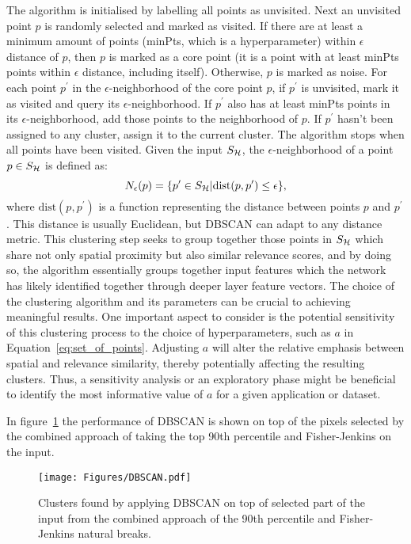 The algorithm is initialised by labelling all points as unvisited. Next an unvisited point $p$ is randomly selected and marked as visited. If there are at least a minimum amount of points (minPts, which is a hyperparameter) within $\epsilon$ distance of $p$, then $p$ is marked as a core point (\ie it is a point with at least minPts points within $\epsilon$ distance, including itself). Otherwise, $p$ is marked as noise. For each point $p^\prime$ in the  $\epsilon$-neighborhood of the core point $p$, if  $p^\prime$ is unvisited, mark it as visited and query its  $\epsilon$-neighborhood. If $p^\prime$ also has at least minPts points in its $\epsilon $-neighborhood, add those points to the neighborhood of $p$. If $p^\prime$ hasn't been assigned to any cluster, assign it to the current cluster. The algorithm stops when all points have been visited. Given the input $S_{\mathcal{H}}$, the $\epsilon$-neighborhood of a point $p \in S_{\mathcal{H}}$ is defined as:
\begin{equation*}
N_\epsilon(p) = \{ p^\prime \in S_{\mathcal{H}} | \text{dist}(p, p^\prime) \leq \epsilon \},
\end{equation*}
where $\text{dist}(p, p^\prime)$ is a function representing the distance between points $p$ and $p^\prime$. This distance is usually Euclidean, but DBSCAN can adapt to any distance metric. This clustering step seeks to group together those points in $S_{\mathcal{H}}$ which share not only spatial proximity but also similar relevance scores, and by doing so, the algorithm essentially groups together input features which the network has likely identified together through deeper layer feature vectors. The choice of the clustering algorithm and its parameters can be crucial to achieving meaningful results. One important aspect to consider is the potential sensitivity of this clustering process to the choice of hyperparameters, such as $a$ in Equation~\ref{eq:set_of_points}. Adjusting $a$ will alter the relative emphasis between spatial and relevance similarity, thereby potentially affecting the resulting clusters. Thus, a sensitivity analysis or an exploratory phase might be beneficial to identify the most informative value of $a$ for a given application or dataset.

In figure~\ref{Fig:DBSCAN} the performance of DBSCAN is shown on top of the pixels selected by the combined approach of taking the top 90th percentile and Fisher-Jenkins on the input.
\begin{figure}[ht!]
	\begin{center}
		\texttt{[image: Figures/DBSCAN.pdf]}
	\end{center}
	\caption{Clusters found by applying DBSCAN on top of selected part of the input from the combined approach of the 90th percentile and Fisher-Jenkins natural breaks.}
	\label{Fig:DBSCAN}
\end{figure} 
